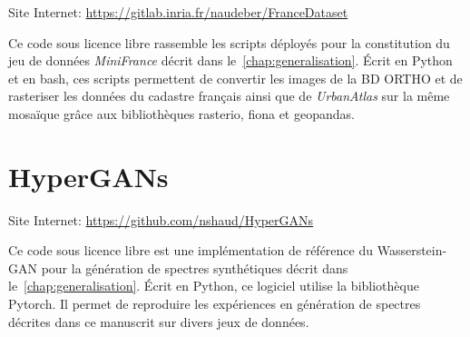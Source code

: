 Site Internet: \url{https://gitlab.inria.fr/naudeber/FranceDataset}

Ce code sous licence libre rassemble les scripts déployés pour la constitution du jeu de données \emph{MiniFrance} décrit dans le~\cref{chap:generalisation}. Écrit en Python et en bash, ces scripts permettent de convertir les images de la BD ORTHO et de rasteriser les données du cadastre français ainsi que de \emph{UrbanAtlas} sur la même mosaïque grâce aux bibliothèques rasterio, fiona et geopandas.

\section{HyperGANs}

Site Internet: \url{https://github.com/nshaud/HyperGANs}

Ce code sous licence libre est une implémentation de référence du Wasserstein-\gls{GAN} pour la génération de spectres synthétiques décrit dans le~\cref{chap:generalisation}. Écrit en Python, ce logiciel utilise la bibliothèque Pytorch. Il permet de reproduire les expériences en génération de spectres décrites dans ce manuscrit sur divers jeux de données.
